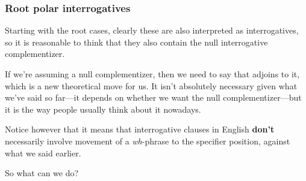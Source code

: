 \documentclass{article}
\begin{document}
\subsubsection{Root polar interrogatives}
Starting with the root cases, clearly these are also interpreted as interrogatives, so it is reasonable to think that they also contain the null interrogative complementizer.  
\begin{exe}
\end{exe}
\vspace{-2em}
If we're assuming a null complementizer, then we need to say that  adjoins to it, which is a new theoretical move for us. It isn't absolutely necessary given what we've said so far---it depends on whether we want the null complementizer---but it is the way people usually think about it nowadays.

Notice however that it means that interrogative clauses in English \textbf{don't} necessarily involve movement of a \emph{wh}-phrase to the specifier position, against what we said earlier.  
\begin{exe}
\begin{multicols}{2}
    \label{ex:willshe}
    \columnbreak
\end{multicols}
\end{exe}
So what can we do?  
\end{document}
